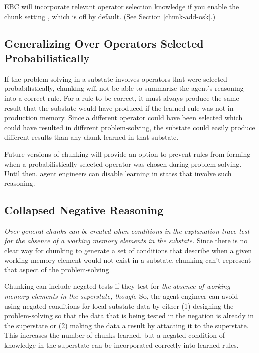 EBC will incorporate relevant operator selection knowledge if you enable the chunk setting , which is off by default. (See Section \ref{chunk-add-osk}.)

\subsection{Generalizing Over Operators Selected Probabilistically}

If the problem-solving in a substate involves operators that were selected probabilistically, chunking will not be able to summarize the agent's reasoning into a correct rule.  For a rule to be correct, it must always produce the same result that the substate would have produced if the learned rule was not in production memory.  Since a different operator could have been selected which could have resulted in different problem-solving, the substate could easily produce different results than any chunk learned in that substate.

Future versions of chunking will provide an option to prevent rules from forming when a probabilistically-selected operator was chosen during problem-solving.  Until then, agent engineers can disable learning in states that involve such reasoning.

\subsection{Collapsed Negative Reasoning}

\emph{Over-general chunks can be created when conditions in the explanation trace test for the absence of a working memory elements in the substate.} Since there is no clear way for chunking to generate a set of conditions that describe when a given working memory element would not exist in a substate, chunking can't represent that aspect of the problem-solving. 

Chunking can include negated tests if they test for \textit{the absence of working memory elements in the superstate, though}.  So, the agent engineer can avoid using negated conditions for local substate data by either (1) designing the problem-solving so that the data that is being tested in the negation is already in the superstate or (2) making the data a result by attaching it to the superstate. This increases the number of chunks learned, but a negated condition of knowledge in the superstate can be incorporated correctly into learned rules.


